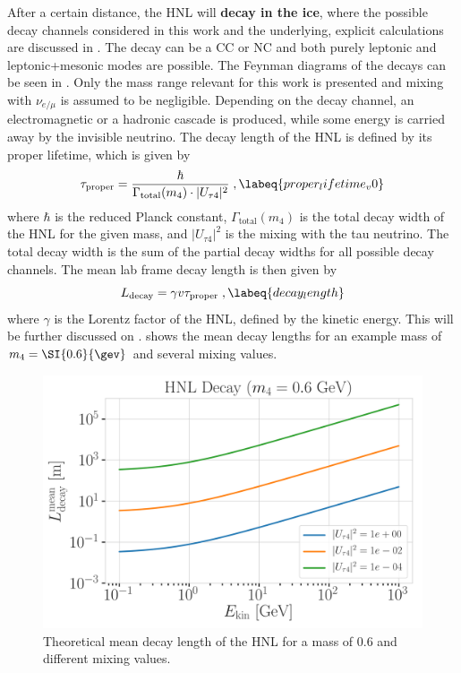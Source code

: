 After a certain distance, the HNL will \textbf{decay in the ice}, where the possible decay channels considered in this work and the underlying, explicit calculations are discussed in . The decay can be a CC or NC and both purely leptonic and leptonic+mesonic modes are possible. The Feynman diagrams of the decays can be seen in . Only the mass range relevant for this work is presented and mixing with $\nu_{e/\mu}$ is assumed to be negligible. Depending on the decay channel, an electromagnetic or a hadronic cascade is produced, while some energy is carried away by the invisible neutrino. The decay length of the HNL is defined by its proper lifetime, which is given by
\begin{equation}
    \tau_\mathrm{proper} = \frac{\hbar}{\Gamma_\mathrm{total}(m_4) \cdot |U_{\tau4}|^2}
    \;,
    \labeq{proper_lifetime_v0}
\end{equation}
where $\hbar$ is the reduced Planck constant, $\Gamma_\mathrm{total}(m_4)$ is the total decay width of the HNL for the given mass, and $|U_{\tau4}|^2$ is the mixing with the tau neutrino. The total decay width is the sum of the partial decay widths for all possible decay channels. The mean lab frame decay length is then given by
\begin{equation}
    L_\mathrm{decay} = \gamma v \tau_\mathrm{proper}
    \;,
    \labeq{decay_length}
\end{equation}
where $\gamma$ is the Lorentz factor of the HNL, defined by the kinetic energy. This will be further discussed on .  shows the mean decay lengths for an example mass of $m_4=\SI{0.6}{\gev}$ and several mixing values.

\begin{figure}[h]
    \includegraphics{figures/hnl_simulation/theory/decay_length_vs_energy_m4_6e-01.png}
    \caption[Theoretical mean HNL decay length (\SI{0.6}{\gev} mass)]{Theoretical mean decay length of the HNL for a mass of \SI{0.6}{\gev} and different mixing values.}
\end{figure}
